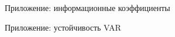 {%
% 

\begin{frame}[t,noframenumbering]{Приложение: информационные коэффициенты}
\vspace{-0.15cm}
\centering
\scriptsize
\setlength{\tabcolsep}{4pt}
\renewcommand{\arraystretch}{0.95}

\end{frame}

\begin{frame}[t,noframenumbering]{Приложение: устойчивость VAR}
\vspace{-0.15cm}
\centering
\scriptsize
\setlength{\tabcolsep}{6pt}
\renewcommand{\arraystretch}{0.95}

\end{frame}


}